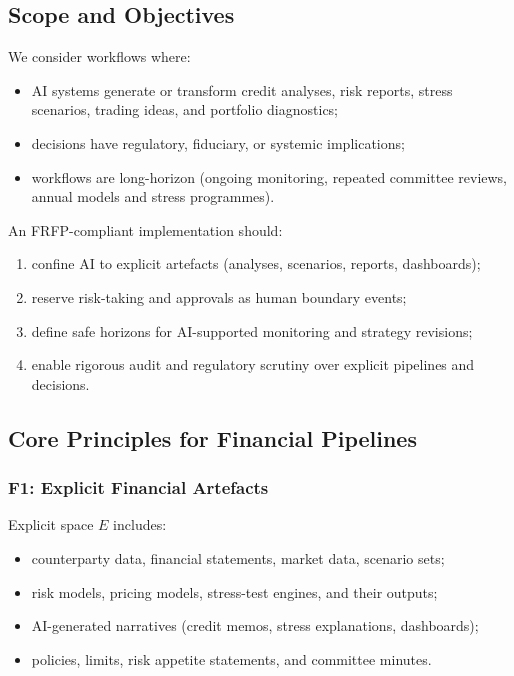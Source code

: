 \subsection{Scope and Objectives}

We consider workflows where:

\begin{itemize}
  \item AI systems generate or transform credit analyses, risk reports,
        stress scenarios, trading ideas, and portfolio diagnostics;
  \item decisions have regulatory, fiduciary, or systemic implications;
  \item workflows are long-horizon (ongoing monitoring, repeated committee
        reviews, annual models and stress programmes).
\end{itemize}

An FRFP-compliant implementation should:

\begin{enumerate}
  \item confine AI to explicit artefacts (analyses, scenarios, reports,
        dashboards);
  \item reserve risk-taking and approvals as human boundary events;
  \item define safe horizons for AI-supported monitoring and strategy
        revisions;
  \item enable rigorous audit and regulatory scrutiny over explicit pipelines
        and decisions.
\end{enumerate}

\subsection{Core Principles for Financial Pipelines}

\subsubsection*{F1: Explicit Financial Artefacts}

Explicit space $E$ includes:

\begin{itemize}
  \item counterparty data, financial statements, market data, scenario sets;
  \item risk models, pricing models, stress-test engines, and their outputs;
  \item AI-generated narratives (credit memos, stress explanations, dashboards);
  \item policies, limits, risk appetite statements, and committee minutes.
\end{itemize}

